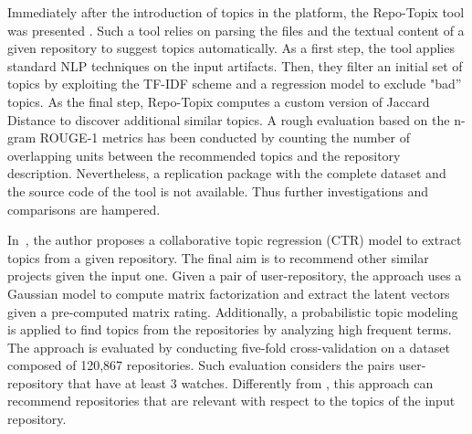 

Immediately after the introduction of topics in the \GH platform, the 
Repo-Topix tool was presented \cite{ganesan_topic_2017}. Such a tool relies on 
parsing the \RM files and the textual content of a given \GH repository to 
suggest topics automatically. As a first step, the tool applies standard NLP 
techniques on the input artifacts. Then, they filter an initial set of topics 
by exploiting the TF-IDF scheme and a regression model to exclude "bad'' 
topics. As the final step, Repo-Topix computes a custom version of Jaccard 
Distance to discover additional similar topics. A rough evaluation based on the 
n-gram ROUGE-1 metrics has been conducted by counting the number of overlapping 
units between the recommended topics and the repository description. 
Nevertheless, a replication package with the complete dataset and the source 
code of the tool is not available. Thus further investigations and comparisons 
are hampered.





In~\cite{orii2012collaborative}, the author proposes a collaborative topic 
regression (CTR) model to extract topics from a given \GH repository. The final 
aim is to recommend other similar projects given the input one. Given a pair of 
user-repository, the approach uses a Gaussian model to compute matrix 
factorization and extract the latent vectors given a pre-computed matrix 
rating. Additionally, a probabilistic topic modeling is applied to find topics 
from the repositories by analyzing high frequent terms. The approach is 
evaluated by conducting five-fold cross-validation on a dataset composed of  
120,867 repositories. Such evaluation considers the pairs user-repository that 
have at least 3 watches. Differently from \TF, this approach can recommend \GH 
 repositories that are relevant with respect to the topics of the input 
 repository.

